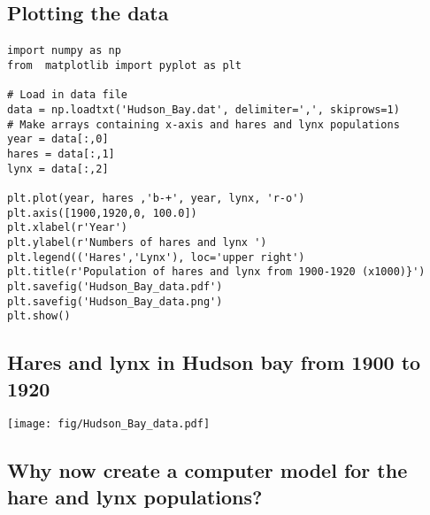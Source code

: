 \documentclass[%
twoside,                 %
final,                   %
10pt]{article}
\begin{document}
\noindent





\subsection*{Plotting the data}


\paragraph{}
\begin{verbatim}
import numpy as np
from  matplotlib import pyplot as plt

# Load in data file
data = np.loadtxt('Hudson_Bay.dat', delimiter=',', skiprows=1)
# Make arrays containing x-axis and hares and lynx populations
year = data[:,0]
hares = data[:,1]
lynx = data[:,2]

plt.plot(year, hares ,'b-+', year, lynx, 'r-o')
plt.axis([1900,1920,0, 100.0])
plt.xlabel(r'Year')
plt.ylabel(r'Numbers of hares and lynx ')
plt.legend(('Hares','Lynx'), loc='upper right')
plt.title(r'Population of hares and lynx from 1900-1920 (x1000)}')
plt.savefig('Hudson_Bay_data.pdf')
plt.savefig('Hudson_Bay_data.png')
plt.show()
\end{verbatim}



\subsection*{Hares and lynx in Hudson bay from 1900 to 1920}



\centerline{\texttt{[image: fig/Hudson\_Bay\_data.pdf]}}




\subsection*{Why now create a computer model for the hare and lynx populations?}

\end{document}

